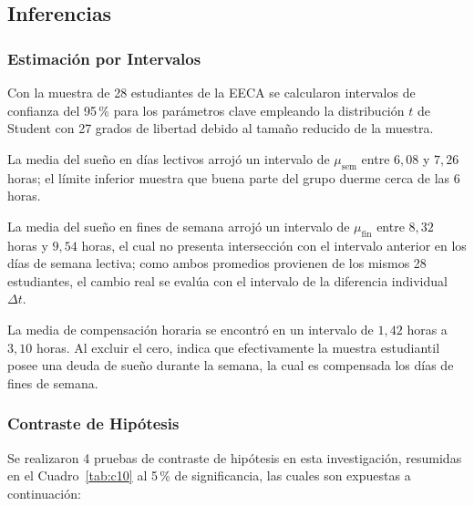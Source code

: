 \documentclass[12pt, letterpaper]{article}
\begin{document}
\subsection{Inferencias}

\subsubsection{Estimación por Intervalos}

Con la muestra de 28 estudiantes de la EECA se calcularon intervalos de confianza del 95\,\% para los parámetros clave empleando la distribución $t$ de Student con 27 grados de libertad debido al tamaño reducido de la muestra.

La media del sueño en días lectivos arrojó un intervalo de $\mu_{\text{sem}}$ entre $6{,}08$ y $7{,}26$ horas; el límite inferior muestra que buena parte del grupo duerme cerca de las 6 horas.

La media del sueño en fines de semana arrojó un intervalo de $\mu_{\text{fin}}$ entre $8{,}32$ horas y $9{,}54$ horas, el cual no presenta intersección con el intervalo anterior en los días de semana lectiva; como ambos promedios provienen de los mismos 28 estudiantes, el cambio real se evalúa con el intervalo de la diferencia individual $\Delta t$.

La media de compensación horaria se encontró en un intervalo de $1{,}42$ horas a $3{,}10$ horas. Al excluir el cero, indica que efectivamente la muestra estudiantil posee una deuda de sueño durante la semana, la cual es compensada los días de fines de semana.

\subsubsection{Contraste de Hipótesis}

Se realizaron 4 pruebas de contraste de hipótesis en esta investigación, resumidas en el Cuadro~\ref{tab:c10} al 5\,\% de significancia, las cuales son expuestas a continuación:
\end{document}
